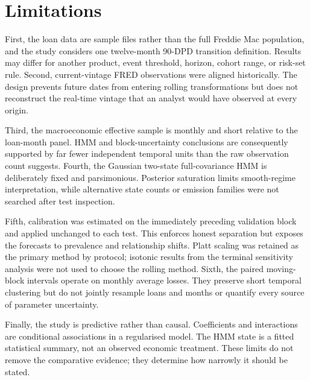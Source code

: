 \section{Limitations}

First, the loan data are sample files rather than the full Freddie Mac population, and the study considers one twelve-month 90-DPD transition definition. Results may differ for another product, event threshold, horizon, cohort range, or risk-set rule. Second, current-vintage FRED observations were aligned historically. The design prevents future dates from entering rolling transformations but does not reconstruct the real-time vintage that an analyst would have observed at every origin.

Third, the macroeconomic effective sample is monthly and short relative to the loan-month panel. HMM and block-uncertainty conclusions are consequently supported by far fewer independent temporal units than the raw observation count suggests. Fourth, the Gaussian two-state full-covariance HMM is deliberately fixed and parsimonious. Posterior saturation limits smooth-regime interpretation, while alternative state counts or emission families were not searched after test inspection.

Fifth, calibration was estimated on the immediately preceding validation block and applied unchanged to each test. This enforces honest separation but exposes the forecasts to prevalence and relationship shifts. Platt scaling was retained as the primary method by protocol; isotonic results from the terminal sensitivity analysis were not used to choose the rolling method. Sixth, the paired moving-block intervals operate on monthly average losses. They preserve short temporal clustering but do not jointly resample loans and months or quantify every source of parameter uncertainty.

Finally, the study is predictive rather than causal. Coefficients and interactions are conditional associations in a regularised model. The HMM state is a fitted statistical summary, not an observed economic treatment. These limits do not remove the comparative evidence; they determine how narrowly it should be stated.
